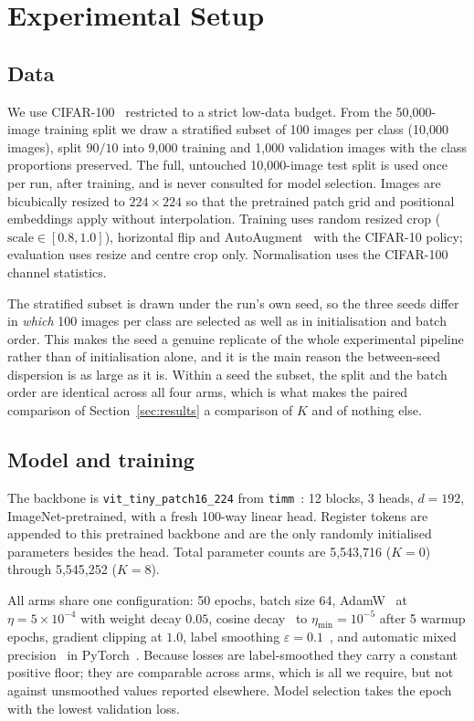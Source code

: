 \section{Experimental Setup}
\label{sec:setup}

\subsection{Data}

We use CIFAR-100~\cite{krizhevsky2009cifar} restricted to a strict low-data
budget. From the 50{,}000-image training split we draw a stratified subset of
100 images per class (10{,}000 images), split $90/10$ into 9{,}000 training and
1{,}000 validation images with the class proportions preserved. The full,
untouched 10{,}000-image test split is used once per run, after training, and is
never consulted for model selection. Images are bicubically resized to
$224 \times 224$ so that the pretrained patch grid and positional embeddings
apply without interpolation. Training uses random resized crop
($\mathrm{scale} \in [0.8, 1.0]$), horizontal flip and
AutoAugment~\cite{cubuk2019autoaugment} with the CIFAR-10 policy; evaluation
uses resize and centre crop only. Normalisation uses the CIFAR-100 channel
statistics.

The stratified subset is drawn under the run's own seed, so the three seeds
differ in \emph{which} 100 images per class are selected as well as in
initialisation and batch order. This makes the seed a genuine replicate of the
whole experimental pipeline rather than of initialisation alone, and it is the
main reason the between-seed dispersion is as large as it is. Within a seed the
subset, the split and the batch order are identical across all four arms, which
is what makes the paired comparison of Section~\ref{sec:results} a comparison of
$K$ and of nothing else.

\subsection{Model and training}

The backbone is \texttt{vit\_tiny\_patch16\_224} from
\texttt{timm}~\cite{wightman2019timm}: 12 blocks, 3 heads, $d = 192$,
ImageNet-pretrained, with a fresh 100-way linear head. Register tokens are
appended to this pretrained backbone and are the only randomly initialised
parameters besides the head. Total parameter counts are 5{,}543{,}716 ($K=0$)
through 5{,}545{,}252 ($K=8$).

All arms share one configuration: 50 epochs, batch size 64,
AdamW~\cite{loshchilov2019adamw} at $\eta = 5 \times 10^{-4}$ with weight decay
$0.05$, cosine decay~\cite{loshchilov2017sgdr} to $\eta_{\min} = 10^{-5}$ after
5 warmup epochs, gradient clipping at $1.0$, label smoothing
$\varepsilon = 0.1$~\cite{szegedy2016rethinking}, and automatic mixed
precision~\cite{micikevicius2018mixed} in PyTorch~\cite{paszke2019pytorch}.
Because losses are label-smoothed they
carry a constant positive floor; they are comparable across arms, which is all
we require, but not against unsmoothed values reported elsewhere. Model
selection takes the epoch with the lowest validation loss.

